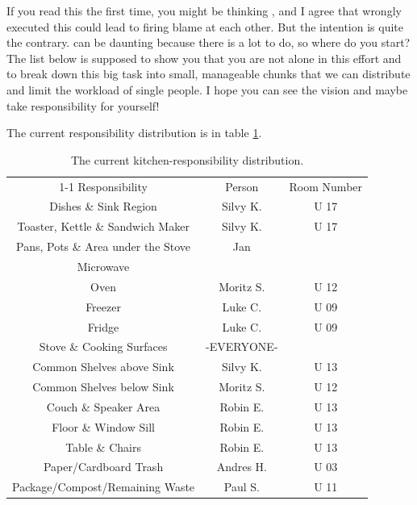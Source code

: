 If you read this the first time, you might be thinking , and I agree that wrongly executed this could lead to firing blame at each other. But the intention is quite the contrary.  can be daunting because there is a lot to do, so where do you start? The list below is supposed to show you that you are not alone in this effort and to break down this big task into small, manageable chunks that we can distribute and limit the workload of single people. I hope you can see the vision and maybe take responsibility for yourself!

The current responsibility distribution is in table \ref{tab:kitchen-responsibilities}.

\begin{table}[htp]
    \centering
    \begin{tabular}{ccc}
        \cline{1-1}
        \rowcolor[HTML]{F89646}
        Responsibility                     & Person     & Room Number \\
        Dishes \& Sink Region              & Silvy K.   & U 17        \\ \hline
        Toaster, Kettle \& Sandwich Maker  & Silvy K.   & U 17        \\ \hline
        Pans, Pots \& Area under the Stove & Jan        &             \\ \hline
        Microwave                          &            &             \\ \hline
        Oven                               & Moritz S.  & U 12        \\ \hline
        Freezer                            & Luke C.    & U 09        \\ \hline
        Fridge                             & Luke C.    & U 09        \\ \hline
        Stove \& Cooking Surfaces          & -EVERYONE- &             \\ \hline
        Common Shelves above Sink          & Silvy K.   & U 13        \\ \hline
        Common Shelves below Sink          & Moritz S.  & U 12        \\ \hline
        Couch \& Speaker Area              & Robin E.   & U 13        \\ \hline
        Floor \& Window Sill               & Robin E.   & U 13        \\ \hline
        Table \& Chairs                    & Robin E.   & U 13        \\ \hline
        Paper/Cardboard Trash              & Andres H.  & U 03        \\ \hline
        Package/Compost/Remaining Waste    & Paul S.    & U 11        \\ \hline
    \end{tabular}
    \caption{The current kitchen-responsibility distribution.}
    \label{tab:kitchen-responsibilities}
\end{table}

